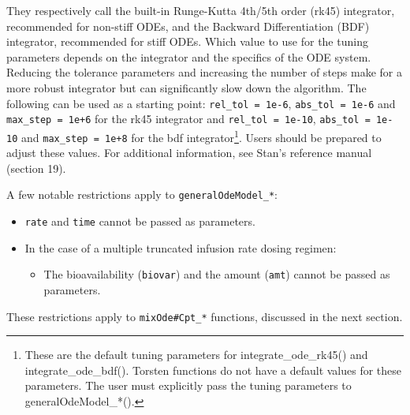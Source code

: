 \documentclass[11pt]{amsart}
\begin{document}
They respectively call the built-in Runge-Kutta 4th/5th order (rk45) integrator, recommended for non-stiff ODEs, and the Backward Differentiation (BDF) integrator, recommended for stiff ODEs. Which value to use for the tuning parameters depends on the integrator and the specifics of the ODE system. Reducing the tolerance parameters and increasing the number of steps make for a more robust integrator but can significantly slow down the algorithm. The following can be used as a starting point:  \mbox{\texttt{rel\_tol = 1e-6}}, \mbox{\texttt{abs\_tol = 1e-6}} and \mbox{\texttt{max\_step = 1e+6}} for the rk45 integrator and \mbox{\texttt{rel\_tol = 1e-10}}, \mbox{\texttt{abs\_tol = 1e-10}} and \mbox{\texttt{max\_step = 1e+8}} for the bdf integrator\footnote{These are the default tuning parameters for integrate\_ode\_rk45() and integrate\_ode\_bdf().  Torsten functions do not have a default values for these parameters. The user must explicitly pass the tuning parameters to generalOdeModel\_*().}. Users should be prepared to adjust these values. For additional information, see Stan's reference manual (section 19).

A few notable restrictions apply to \texttt{generalOdeModel\_*}:
\begin{itemize}
  \item \texttt{rate} and \texttt{time} cannot be passed as parameters.
  \item In the case of a multiple truncated infusion rate dosing regimen:
  \begin{itemize}
    \item The bioavailability (\texttt{biovar}) and the amount (\texttt{amt}) cannot be passed as parameters.
  \end{itemize}
\end{itemize}

These restrictions apply to \texttt{mixOde\#Cpt\_*} functions, discussed in the next section.

\clearpage
\end{document}
